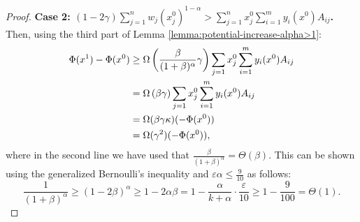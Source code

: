 \documentclass[11pt]{article}
\begin{document}
\begin{proof}
\noindent\textbf{Case 2: $(1-2\gamma)\sum_{j=1}^n w_j(x_j^0)^{1-\alpha} > \sum_{j=1}^n x_j^0 \sum_{i=1}^m y_i(x^0)A_{ij}$.} Then, using the third part of Lemma \ref{lemma:potential-increase-alpha>1}:
\begin{align}
\Phi(x^1) - \Phi(x^0) &\geq \Omega\left(\frac{\beta}{(1+\beta)^{\alpha}}\gamma\right)\sum_{j=1}x_j^0 \sum_{i=1}^m y_i(x^0)A_{ij}\notag\\
&= \Omega\left({\beta}\gamma\right)\sum_{j=1}x_j^0 \sum_{i=1}^m y_i(x^0)A_{ij}\notag\\
&= \Omega(\beta\gamma\kappa)(-\Phi(x^0))\notag\\
&= \Omega(\gamma^2)(-\Phi(x^0)), \notag \end{align}
where in the second line we have used that $\frac{\beta}{(1+\beta)^{\alpha}} = \Theta(\beta)$. This can be shown using the generalized Bernoulli's inequality and $\varepsilon\alpha\leq\frac{9}{10}$ as follows:
\begin{equation*}
\frac{1}{(1+\beta)^{\alpha}}\geq (1-2\beta)^{\alpha}\geq 1-2\alpha\beta = 1 - \frac{\alpha}{k+\alpha}\cdot\frac{\varepsilon}{10}\geq 1 - \frac{9}{100} = \Theta(1).
\end{equation*}
\end{proof}
\end{document}
